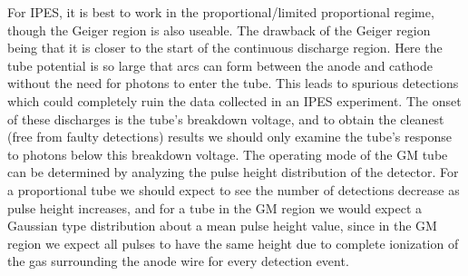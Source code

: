 For IPES, it is best to work in the proportional/limited proportional regime, though the Geiger region is also useable. The drawback of the Geiger region being that it is closer to the 
start of the continuous discharge region. Here the tube potential is so large that arcs can form between the anode and cathode without the need for photons to enter the tube. This
leads to spurious detections which could completely ruin the data collected in an IPES experiment. The onset of these discharges is the tube's breakdown voltage, and to obtain the 
cleanest (free from faulty detections) results we should only examine the tube's response to photons below this breakdown voltage. The operating mode of the GM tube can be determined
by analyzing the pulse height distribution of the detector. For a proportional tube we should expect to see the number of detections decrease as pulse height increases, and for a 
tube in the GM region we would expect a Gaussian type distribution about a mean pulse height value, since in the GM region we expect all pulses to have the same height due to complete
ionization of the gas surrounding the anode wire for every detection event. 
